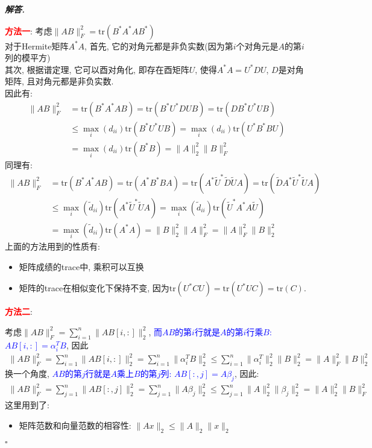 \documentclass[10pt, a4paper, oneside]{ctexart}
\newcommand{\norm}[1]{\| #1 \|}
\newenvironment{solution}{%
  \par\noindent\textbf{\textit{解答. }}\ignorespaces
}{%
  \hfill\ensuremath{\square}\par %
}
\begin{document}
\begin{solution}
\textcolor{red}{\textbf{方法一}}: 考虑$\norm{AB}^2_F=\text{tr}(B^*A^*AB^*)$\\
对于Hermite矩阵$A^*A$, 首先, 它的对角元都是非负实数(因为第$i$个对角元是$A$的第$i$列的模平方)\\
其次, 根据谱定理, 它可以酉对角化, 即存在酉矩阵$U$, 使得$A^*A=U^*DU$, $D$是对角矩阵, 且对角元都是非负实数.\\
因此有:
\begin{align*}
    \norm{AB}_F^2&=\text{tr}(B^*A^*AB)=\text{tr}(B^*U^*DUB)=\text{tr}(DB^*U^*UB)\\&\leq \max_{i}(d_{ii})\text{tr}(B^*U^*UB)=\max_{i}(d_{ii})\text{tr}(U^*B^*BU)\\&=\max_{i}(d_{ii})\text{tr}(B^*B)=\norm{A}_2^2\norm{B}_F^2
\end{align*}
同理有:
\begin{align*}
    \norm{AB}_F^2&=\text{tr}(B^*A^*AB)=\text{tr}(A^*B^*BA)=\text{tr}(A^*\tilde{U}^*\tilde{D}\tilde{U}A)=\text{tr}(\tilde{D}A^*\tilde{U}^*\tilde{U}A)\\&\leq \max_{i}(\tilde{d}_{ii})\text{tr}(A^*\tilde{U}^*\tilde{U}A)=\max_{i}(\tilde{d}_{ii})\text{tr}(\tilde{U}^*A^*A\tilde{U})\\&=\max_{i}(\tilde{d}_{ii})\text{tr}(A^*A)=\norm{B}_2^2\norm{A}_F^2=\norm{A}_F^2\norm{B}_2^2
\end{align*}
上面的方法用到的性质有:
\begin{itemize}
    \item 矩阵成绩的trace中, 乘积可以互换
    \item 矩阵的trace在相似变化下保持不变, 因为$\text{tr}(U^*CU)=\text{tr}(U^*UC)=\text{tr}(C)$.
\end{itemize}

\textcolor{red}{\textbf{方法二}}: 

考虑$\norm{AB}_F^2=\sum_{i=1}^n \norm{AB[i,:]}_2^2$, \textcolor{blue}{而$AB$的第$i$行就是$A$的第$i$行乘$B$: $AB[i,:]=\alpha_i^TB$}, 因此
\begin{align*}
    \norm{AB}_F^2=\sum_{i=1}^n \norm{AB[i,:]}_2^2=\sum_{i=1}^n \norm{\alpha_i^TB}_2^2\leq \sum_{i=1}^n \norm{\alpha_i^T}_2^2\norm{B}_2^2=\norm{A}_F^2\norm{B}_2^2
\end{align*}
换一个角度, \textcolor{blue}{$AB$的第$j$行就是$A$乘上$B$的第$j$列: $AB[:,j]=A\beta_j$}, 因此:
\begin{align*}
    \norm{AB}_F^2=\sum_{j=1}^n \norm{AB[:,j]}_2^2=\sum_{j=1}^n \norm{A\beta_j}_2^2\leq \sum_{j=1}^n \norm{A}_2^2\norm{\beta_j}_2^2=\norm{A}_2^2\norm{B}_F^2
\end{align*}
这里用到了:
\begin{itemize}
    \item 矩阵范数和向量范数的相容性: $\norm{Ax}_2\leq \norm{A}_2\norm{x}_2$
\end{itemize}
\end{solution}
\end{document}
